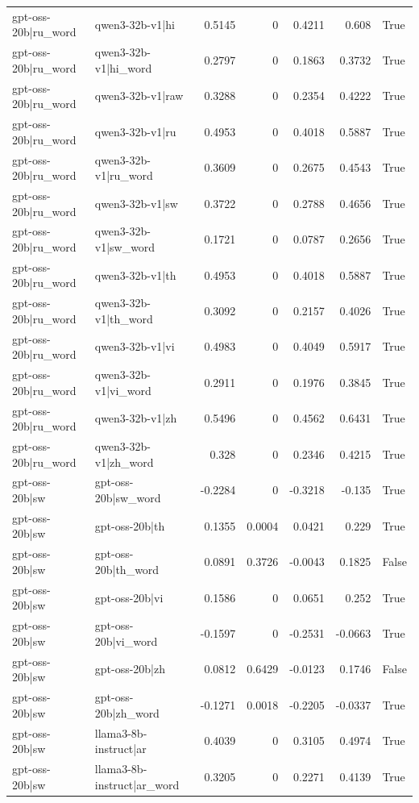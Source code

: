 \begin{table}
\begin{tabular}{l l r r r r l}
gpt-oss-20b|ru_word & qwen3-32b-v1|hi & 0.5145 & 0 & 0.4211 & 0.608 & True \\
gpt-oss-20b|ru_word & qwen3-32b-v1|hi_word & 0.2797 & 0 & 0.1863 & 0.3732 & True \\
gpt-oss-20b|ru_word & qwen3-32b-v1|raw & 0.3288 & 0 & 0.2354 & 0.4222 & True \\
gpt-oss-20b|ru_word & qwen3-32b-v1|ru & 0.4953 & 0 & 0.4018 & 0.5887 & True \\
gpt-oss-20b|ru_word & qwen3-32b-v1|ru_word & 0.3609 & 0 & 0.2675 & 0.4543 & True \\
gpt-oss-20b|ru_word & qwen3-32b-v1|sw & 0.3722 & 0 & 0.2788 & 0.4656 & True \\
gpt-oss-20b|ru_word & qwen3-32b-v1|sw_word & 0.1721 & 0 & 0.0787 & 0.2656 & True \\
gpt-oss-20b|ru_word & qwen3-32b-v1|th & 0.4953 & 0 & 0.4018 & 0.5887 & True \\
gpt-oss-20b|ru_word & qwen3-32b-v1|th_word & 0.3092 & 0 & 0.2157 & 0.4026 & True \\
gpt-oss-20b|ru_word & qwen3-32b-v1|vi & 0.4983 & 0 & 0.4049 & 0.5917 & True \\
gpt-oss-20b|ru_word & qwen3-32b-v1|vi_word & 0.2911 & 0 & 0.1976 & 0.3845 & True \\
gpt-oss-20b|ru_word & qwen3-32b-v1|zh & 0.5496 & 0 & 0.4562 & 0.6431 & True \\
gpt-oss-20b|ru_word & qwen3-32b-v1|zh_word & 0.328 & 0 & 0.2346 & 0.4215 & True \\
gpt-oss-20b|sw & gpt-oss-20b|sw_word & -0.2284 & 0 & -0.3218 & -0.135 & True \\
gpt-oss-20b|sw & gpt-oss-20b|th & 0.1355 & 0.0004 & 0.0421 & 0.229 & True \\
gpt-oss-20b|sw & gpt-oss-20b|th_word & 0.0891 & 0.3726 & -0.0043 & 0.1825 & False \\
gpt-oss-20b|sw & gpt-oss-20b|vi & 0.1586 & 0 & 0.0651 & 0.252 & True \\
gpt-oss-20b|sw & gpt-oss-20b|vi_word & -0.1597 & 0 & -0.2531 & -0.0663 & True \\
gpt-oss-20b|sw & gpt-oss-20b|zh & 0.0812 & 0.6429 & -0.0123 & 0.1746 & False \\
gpt-oss-20b|sw & gpt-oss-20b|zh_word & -0.1271 & 0.0018 & -0.2205 & -0.0337 & True \\
gpt-oss-20b|sw & llama3-8b-instruct|ar & 0.4039 & 0 & 0.3105 & 0.4974 & True \\
gpt-oss-20b|sw & llama3-8b-instruct|ar_word & 0.3205 & 0 & 0.2271 & 0.4139 & True \\

\end{tabular}
\end{table}
